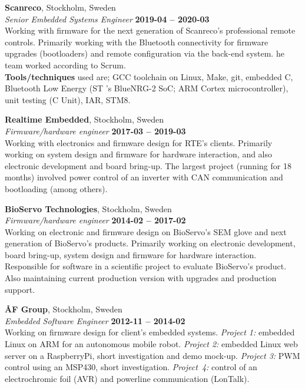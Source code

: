 \documentclass[a4paper,margin,line]{res} \usepackage{latexsym}
\begin{document}
\begin{resume}
{\bf Scanreco}, Stockholm, Sweden\\
{\em Senior Embedded Systems Engineer} \hfill {\bf 2019-04 --
  2020-03}\\ Working with firmware for the next generation of
Scanreco's professional remote controls. Primarily working with the
Bluetooth connectivity for firmware upgrades (bootloaders) and remote
configuration via the back-end system. he team worked according to
Scrum. \\ {\bf Tools/techniques} used are; GCC toolchain on Linux, Make, git,
embedded C, Bluetooth Low Energy (ST 's BlueNRG-2 SoC; ARM Cortex
microcontroller), unit testing (C Unit), IAR, STM8.

{\bf Realtime Embedded}, Stockholm, Sweden\\
{\em Firmware/hardware engineer} \hfill {\bf 2017-03 --
  2019-03}\\ Working with electronics and firmware design for RTE's
clients. Primarily working on system design and firmware for hardware
interaction, and also electronic development and board bring-up. The
largest project (running for 18 months) involved power control of an
inverter with CAN communication and bootloading (among others).

{\bf BioServo Technologies}, Stockholm, Sweden\\
{\em Firmware/hardware engineer} \hfill {\bf 2014-02 --
  2017-02}\\ Working on electronic and firmware design on BioServo's
SEM glove and next generation of BioServo's products.  Primarily
working on electronic development, board bring-up, system design and
firmware for hardware interaction. Responsible for software in a
scientific project to evaluate BioServo's product.  Also maintaining
current production version with upgrades and production support.


{\bf ÅF Group}, Stockholm, Sweden\\
{\em Embedded Software Engineer} \hfill {\bf 2012-11 -- 2014-02}\\ Working
on firmware design for client's embedded systems.  {\em Project 1:}
embedded Linux on ARM for an autonomous mobile robot.  {\em Project
  2:} embedded Linux web server on a RaspberryPi, short investigation
and demo mock-up.  {\em Project 3:} PWM control using an MSP430, short
investigation.  {\em Project~4:} control of an electrochromic foil
(AVR) and powerline communication (LonTalk).


\end{resume}
\end{document}
